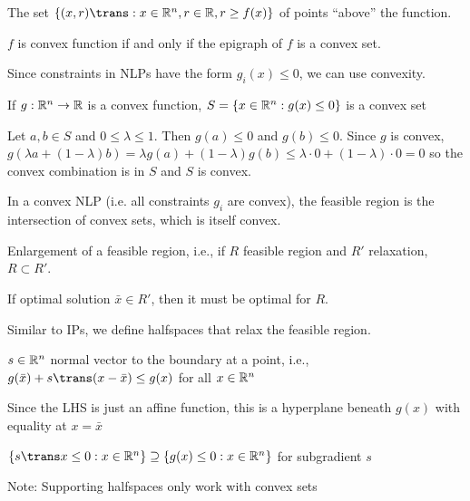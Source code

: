 \begin{defn}[epigraph]
  The set $\{(x,r)\trans : x \in \R^n, r \in \R, r \geq f(x)\}$ of points
  ``above'' the function.
\end{defn}

\begin{lemma}
  $f$ is convex function if and only if the epigraph of $f$ is a convex set.
\end{lemma}

Since constraints in NLPs have the form $g_i(x) \leq 0$, we can use convexity.

\begin{prop}
  If $g : \mathbb{R}^n \to \mathbb{R}$ is a convex function,
  $S=\{x \in \mathbb{R}^n : g(x) \leq 0\}$ is a convex set
\end{prop}
\begin{prf}
  Let $a,b\in S$ and $0 \leq \lambda \leq 1$. Then
  $g(a) \leq 0$ and $g(b) \leq 0$. Since $g$ is convex,
  $g(\lambda a + (1-\lambda)b) = \lambda g(a) + (1-\lambda)g(b) \leq \lambda\cdot 0 + (1-\lambda)\cdot 0 = 0$
  so the convex combination is in $S$ and $S$ is convex.
\end{prf}

In a convex NLP (i.e. all constraints $g_i$ are convex),
the feasible region is the intersection of convex sets,
which is itself convex.

\begin{defn}[relaxation]
  Enlargement of a feasible region, i.e.,
  if $R$ feasible region and $R'$ relaxation, $R \subset R'$.
\end{defn}

If optimal solution $\bar x \in R'$, then it must be optimal for $R$.

Similar to IPs, we define halfspaces that relax the feasible region.

\begin{defn}[subgradient]
  $s \in \mathbb{R}^n$ normal vector to the
  boundary at a point, i.e., $g(\bar x) + s\trans(x-\bar x) \leq g(x)$
  for all $x \in \mathbb{R}^n$
\end{defn}
Since the LHS is just an affine function, this is a hyperplane
beneath $g(x)$ with equality at $x = \bar x$

\begin{defn}
  $\{s\trans x \leq 0 : x \in \R^n\} \supseteq \{g(x) \leq 0 : x \in \R^n\}$
  for subgradient $s$
\end{defn}

Note: Supporting halfspaces only work with convex sets

